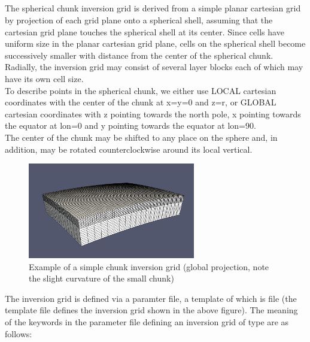 \subsection{} \label{basic_steps,sec:invgrid,sub:schunk}
The spherical chunk inversion grid is derived from a simple planar cartesian
grid by projection of each grid plane onto a spherical shell, assuming that
the cartesian grid plane touches the spherical shell at its center.
Since cells have uniform size in the planar cartesian grid plane, cells
on the spherical shell become successively smaller with distance from the 
center of the spherical chunk. Radially, the inversion grid may consist of
several layer blocks each of which may have its own cell size.\\
To describe points in the spherical chunk, we either use LOCAL cartesian coordinates
with the center of the chunk at x=y=0 and z=r, or GLOBAL cartesian coordinates
with z pointing towards the north pole, x pointing towards the equator at lon=0
and y pointing towards the equator at lon=90.\\
The center of the chunk may be shifted to any place on the sphere and, in addition,
may be rotated counterclockwise around its local vertical.

\begin{figure}[ht]
  \centering
  \includegraphics[width=0.65\textwidth]{images/schunkInversionGrid_manual.png}
  \caption{Example of a simple chunk inversion grid (global projection, note the slight curvature of the small chunk)}
  \label{basic_steps,sec:invgrid,sub:schunk,fig:grid}
\end{figure}

The inversion grid is defined via a paramter file, a template of which is file 
 (the template file defines the inversion grid
shown in the above figure).
The meaning of the keywords in the parameter file defining an inversion grid of type 
are as follows:

